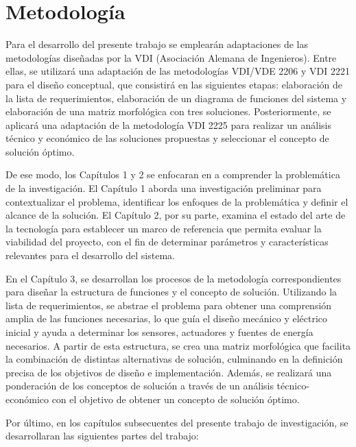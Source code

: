 \section{Metodología}

Para el desarrollo del presente trabajo se emplearán adaptaciones de las metodologías diseñadas por la VDI (Asociación Alemana de Ingenieros). Entre ellas, se utilizará una adaptación de las metodologías VDI/VDE 2206 \cite{VDI2206} y VDI 2221 \cite{VDI2221} para el diseño conceptual, que consistirá en las siguientes etapas: elaboración de la lista de requerimientos, elaboración de un diagrama de funciones del sistema y elaboración de una matriz morfológica con tres soluciones. Posteriormente, se aplicará una adaptación de la metodología VDI 2225 \cite{VDI2225} para realizar un análisis técnico y económico de las soluciones propuestas y seleccionar el concepto de solución óptimo.

De ese modo, los Capítulos 1 y 2 se enfocaran en a comprender la problemática de la investigación. El Capítulo 1 aborda una investigación preliminar para contextualizar el problema, identificar los enfoques de la problemática y definir el alcance de la solución. El Capítulo 2, por su parte, examina el estado del arte de la tecnología para establecer un marco de referencia que permita evaluar la viabilidad del proyecto, con el fin de determinar parámetros y características relevantes para el desarrollo del sistema.

En el Capítulo 3, se desarrollan los procesos de la metodología correspondientes para diseñar la estructura de funciones y el concepto de solución. Utilizando la lista de requerimientos, se abstrae el problema para obtener una comprensión amplia de las funciones necesarias, lo que guía el diseño mecánico y eléctrico inicial y ayuda a determinar los sensores, actuadores y fuentes de energía necesarios. A partir de esta estructura, se crea una matriz morfológica que facilita la combinación de distintas alternativas de solución, culminando en la definición precisa de los objetivos de diseño e implementación. Además, se realizará una ponderación de los conceptos de solución a través de un análisis técnico-económico con el objetivo de obtener un concepto de solución óptimo.

Por último, en los capítulos subsecuentes del presente trabajo de investigación, se desarrollaran las siguientes partes del trabajo:

